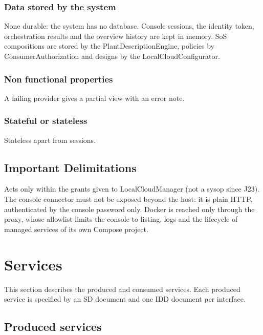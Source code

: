\documentclass[a4paper]{arrowhead}
\begin{document}
\subsubsection{Data stored by the system}

None durable: the system has no database. Console sessions, the identity token, orchestration results and the overview history are kept in memory. SoS compositions are stored by the Plant\allowbreak{}Description\allowbreak{}Engine, policies by Consumer\allowbreak{}Authorization and designs by the Local\allowbreak{}Cloud\allowbreak{}Configurator.

\subsubsection{Non functional properties}

A failing provider gives a partial view with an error note.

\subsubsection{Stateful or stateless}

Stateless apart from sessions.

\subsection{Important Delimitations}
\label{sec:delimitations}

Acts only within the grants given to LocalCloudManager (not a sysop since J23). The console connector must not be exposed beyond the host: it is plain HTTP, authenticated by the console password only. Docker is reached only through the proxy, whose allowlist limits the console to listing, logs and the lifecycle of managed services of its own Compose project.

\newpage

\section{Services}
\label{sec:services}

This section describes the produced and consumed services. Each produced service is specified by an SD document and one IDD document per interface.

\subsection{Produced services}
\end{document}
